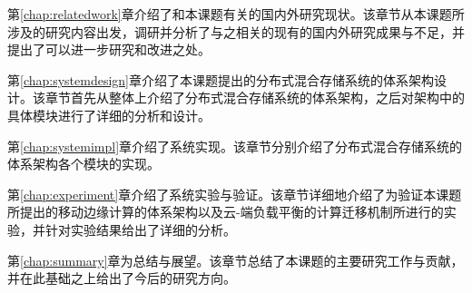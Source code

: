 第\ref{chap:relatedwork}章介绍了和本课题有关的国内外研究现状。该章节从本课题所涉及的研究内容出发，调研并分析了与之相关的现有的国内外研究成果与不足，并提出了可以进一步研究和改进之处。

第\ref{chap:systemdesign}章介绍了本课题提出的分布式混合存储系统的体系架构设计。该章节首先从整体上介绍了分布式混合存储系统的体系架构，之后对架构中的具体模块进行了详细的分析和设计。

第\ref{chap:systemimpl}章介绍了系统实现。该章节分别介绍了分布式混合存储系统的体系架构各个模块的实现。

第\ref{chap:experiment}章介绍了系统实验与验证。该章节详细地介绍了为验证本课题所提出的移动边缘计算的体系架构以及云-端负载平衡的计算迁移机制所进行的实验，并针对实验结果给出了详细的分析。

第\ref{chap:summary}章为总结与展望。该章节总结了本课题的主要研究工作与贡献，并在此基础之上给出了今后的研究方向。